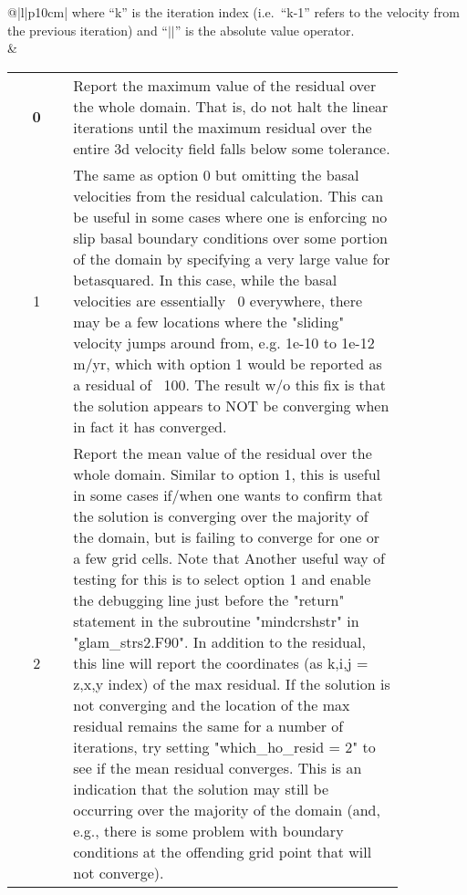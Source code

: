 \begin{center}
\begin{supertabular*}{\textwidth}{@{\extracolsep{\fill}}|l|p{10cm}|}
    where ``k'' is the iteration index (i.e.\ ``k-1'' refers to the velocity
    from the previous iteration) and ``$||$'' is the absolute value operator. \\ &
    \begin{tabular}[t]{cp{0.85\linewidth}}
      {\bf 0} & Report the maximum value of the residual over the whole domain.
          That is, do not halt the linear iterations until the maximum residual
          over the entire 3d velocity field falls below some tolerance.\\
      1 & The same as option 0 but omitting the basal velocities from the
          residual calculation. This can be useful in some cases where one is
          enforcing no slip basal boundary conditions over some portion of the
          domain by specifying a very large value for betasquared. In this case,
          while the basal velocities are essentially ~0 everywhere, there may be
          a few locations where the "sliding" velocity jumps around from, e.g.
          1e-10 to 1e-12 m/yr, which with option 1 would be reported as a
          residual of ~100. The result w/o this fix is that the solution appears
          to NOT be converging when in fact it has converged.\\
      2 & Report the mean value of the residual over the whole domain.
          Similar to option 1, this is useful in some cases if/when one wants to
          confirm that the solution is converging over the majority of the
          domain, but is failing to converge for one or a few grid cells. Note
          that Another useful way of testing for this is to select option 1 and
          enable the debugging line just before the "return" statement in the
          subroutine "mindcrshstr" in "glam\_strs2.F90". In addition to the
          residual, this line will report the coordinates (as k,i,j = z,x,y
          index) of the max residual. If the solution is not converging and the
          location of the max residual remains the same for a number of
          iterations, try setting "which\_ho\_resid = 2" to see if the mean
          residual converges. This is an indication that the solution may still
          be occurring over the majority of the domain (and, e.g., there is some
          problem with boundary conditions at the offending grid point that will
          not converge).\\
    \end{tabular}\\  
    \hline
    \hline
    \\

\end{supertabular*}
\end{center}
